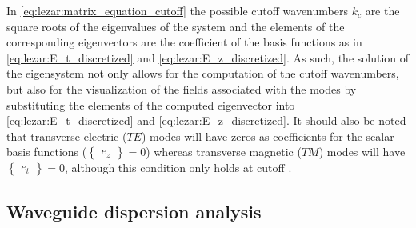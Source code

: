 In \eqref{eq:lezar:matrix_equation_cutoff} the possible cutoff
wavenumbers $k_c$ are the square roots of the eigenvalues of the system
and the elements of the corresponding eigenvectors are the coefficient
of the basis functions as in \eqref{eq:lezar:E_t_discretized}
and \eqref{eq:lezar:E_z_discretized}. As such, the solution of
the eigensystem not only allows for the computation of the cutoff
wavenumbers, but also for the visualization of the fields associated with
the modes by substituting the elements of the computed eigenvector into
\eqref{eq:lezar:E_t_discretized} and \eqref{eq:lezar:E_z_discretized}. It
should also be noted that transverse electric ($TE$) modes
will have zeros as coefficients for the scalar basis functions
($\begin{Bmatrix}e_z\end{Bmatrix} = 0$) whereas transverse magnetic ($TM$)
modes will have $\begin{Bmatrix}e_t\end{Bmatrix} = 0$, although this
condition only holds at cutoff \citep{Pozar2005}.

\subsection{Waveguide dispersion analysis}
\label{lezar:sec:propagation_curves}

